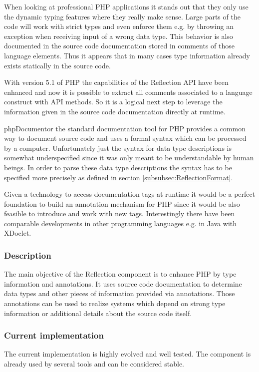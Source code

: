 \documentclass[10pt,final,a4paper,oneside]{article}
\begin{document}
When looking at professional PHP applications
it stands out that they only use the dynamic
typing features where they really make sense.
Large parts of the code will work with strict
types and even enforce them e.g. by throwing
an exception when receiving input of a wrong data type.
This behavior is also documented in the source code
documentation stored in comments of those language elements.
Thus it appears that in many cases type information
already exists statically in the source code.

With version 5.1 of PHP the capabilities of the Reflection API
have been enhanced and now it is possible to extract all comments
associated to a language construct with API methods.
So it is a logical next step to leverage the information
given in the source code documentation directly at runtime.

phpDocumentor \cite{phpDocumentor} the standard documentation tool for PHP
provides a common way to document source code and
uses a formal syntax which can be processed by a computer.
Unfortunately just the syntax for data type descriptions
is somewhat underspecified since it was only meant
to be understandable by human beings.
In order to parse these data type descriptions
the syntax has to be specified more precisely
as defined in section \ref{subsubsec:ReflectionFormat}.

Given a technology to access documentation tags
at runtime it would be a perfect foundation
to build an annotation mechanism for PHP
since it would be also feasible to introduce and work with new tags.
Interestingly there have been comparable developments in other
programming languages e.g. in Java with XDoclet.


\subsubsection{Description}
The main objective of the Reflection component is
to enhance PHP by type information and annotations.
It uses source code documentation to determine
data types and other pieces of information provided
via annotations.
Those annotations can be used to realize systems
which depend on strong type information or
additional details about the source code itself.


\subsubsection{Current implementation}
The current implementation is highly evolved and well tested.
The component is already used by several tools
and can be considered stable.
\end{document}

